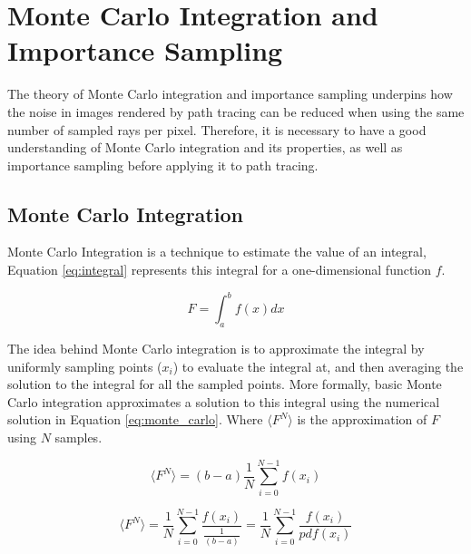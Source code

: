 \documentclass[ %
                    author={Callum Pearce},
                supervisor={Dr. Neill Campbell},
                    degree={MEng},
                     title={How effective are Temporal difference learning methods for reducing the number of zero contribution light paths while still accurately approximating Global Illumination in Path tracing?},
                  subtitle={},
                      type={research},
                      year={2019} ]{dissertation}
\begin{document}
\section{Monte Carlo Integration and Importance Sampling}
\label{sec:monte_carlo}
The theory of Monte Carlo integration and importance sampling underpins how the noise in images rendered by path tracing can be reduced when using the same number of sampled rays per pixel. Therefore, it is necessary to have a good understanding of Monte Carlo integration and its properties, as well as importance sampling before applying it to path tracing.

\subsection{Monte Carlo Integration}
\label{sec:monte_carlo_approx}
 Monte Carlo Integration is a technique to estimate the value of an integral, Equation \ref{eq:integral} represents this integral for a one-dimensional function $f$.

\begin{equation}
\label{eq:integral}
F = \int_a^b f(x) dx
\end{equation}

The idea behind Monte Carlo integration is to approximate the integral by uniformly sampling points ($x_i$) to evaluate the integral at, and then averaging the solution to the integral for all the sampled points. More formally, basic Monte Carlo integration approximates a solution to this integral using the numerical solution in Equation \ref{eq:monte_carlo}. Where $\langle F^N \rangle$ is the approximation of $F$ using $N$ samples.

\begin{equation}
\label{eq:monte_carlo}
\langle F^N \rangle = (b - a) \frac{1}{N} \sum^{N-1}_{i=0} f(x_i)
\end{equation}

\begin{equation}
\label{eq:generalized_mc}
\langle F^N \rangle = \frac{1}{N} \sum^{N-1}_{i=0} \frac{f(x_i)}{\frac{1}{(b-a)}} 
 = \frac{1}{N} \sum^{N-1}_{i=0} \frac{f(x_i)}{pdf(x_i)}
\end{equation}
\end{document}
